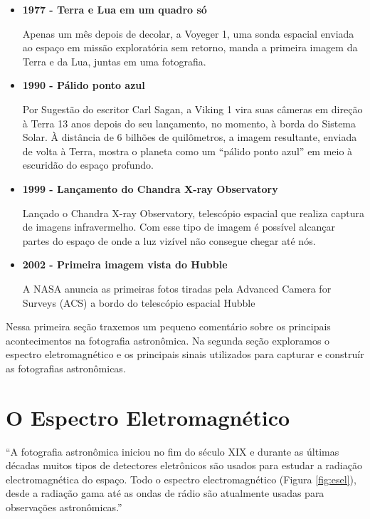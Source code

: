\documentclass[
	article,			%
	12pt,				%
	oneside,			%
	a4paper,			%
	english,			%
	brazil,				%
	sumario=tradicional
	]{abntex2}
\begin{document}
\begin{itemize}
	\item \textbf{1977 - Terra e Lua em um quadro só}

	Apenas um mês depois de decolar, a Voyeger 1, uma sonda espacial enviada ao
	espaço em missão exploratória sem retorno, manda a primeira imagem da Terra
	e da Lua, juntas em uma fotografia. \cite{fotografia2011ng}

	\item \textbf{1990 - Pálido ponto azul}

	Por Sugestão do escritor Carl Sagan, a Viking 1 vira suas câmeras em direção
	à Terra 13 anos depois do seu lançamento, no momento, à borda do Sistema
	Solar. À distância de 6 bilhões de quilômetros, a imagem resultante, enviada
	de volta à Terra, mostra o planeta como um ``pálido ponto azul'' em meio à
	escuridão do espaço profundo. \cite{fotografia2011ng}

	\item \textbf{1999 - Lançamento do Chandra X-ray Observatory}

	Lançado o Chandra X-ray Observatory, telescópio espacial que realiza captura
	de imagens infravermelho. Com esse tipo de imagem é possível alcançar partes
	do espaço de onde a luz vizível não consegue chegar até nós.
	\cite{chandraxray}

	\item \textbf{2002 - Primeira imagem vista do Hubble}

	A NASA anuncia as primeiras fotos tiradas pela Advanced Camera for Surveys
	(ACS) a bordo do telescópio espacial Hubble \cite{fotografia2011ng}
\end{itemize} 

Nessa primeira seção traxemos um pequeno comentário sobre os principais
acontecimentos na fotografia astronômica. Na segunda seção exploramos o espectro
eletromagnético e os principais sinais utilizados para capturar e construír as
fotografias astronômicas.

\section{O Espectro Eletromagnético}

\begin{citacao}
	``A fotografia astronômica iniciou no fim do século XIX e durante as últimas 
	décadas muitos tipos de detectores eletrônicos são usados para estudar a
	radiação electromagnética do espaço. Todo o espectro electromagnético
	(Figura \ref{fig:esel}), desde a radiação gama até as ondas de rádio são
	atualmente usadas para observações astronômicas.'' \cite{fotometria}
\end{citacao}
\end{document}
